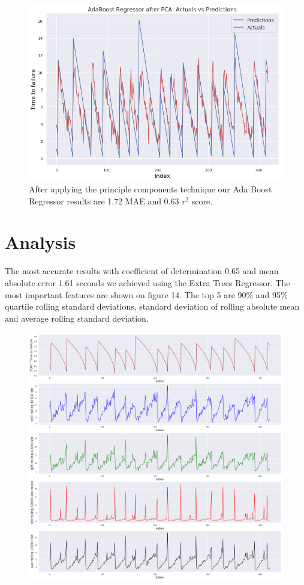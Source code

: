 \documentclass[]{llncs} %
\begin{document}
\begin{figure}[H]
	\centering
	\includegraphics[width=.9\linewidth]{results2PCA}
	\caption{After applying the principle components technique our  Ada Boost Regressor results are 1.72 MAE and 0.63 $r^2$ score.}
	\label{fig:results2PCA}
\end{figure}


\clearpage
\newpage
\section{Analysis}
The most accurate results with coefficient of determination 0.65 and mean absolute error 1.61 seconds we achieved using the Extra Trees Regressor. The most important features are shown on figure 14. The top 5 are 90\% and 95\% quartile rolling standard deviations, standard deviation of rolling absolute mean and average rolling standard deviation.
\begin{figure}[H]
	\centering
	\includegraphics[width=1\linewidth]{analysis}
	\caption{}
	\label{fig:analysis}
\end{figure}
\end{document}
